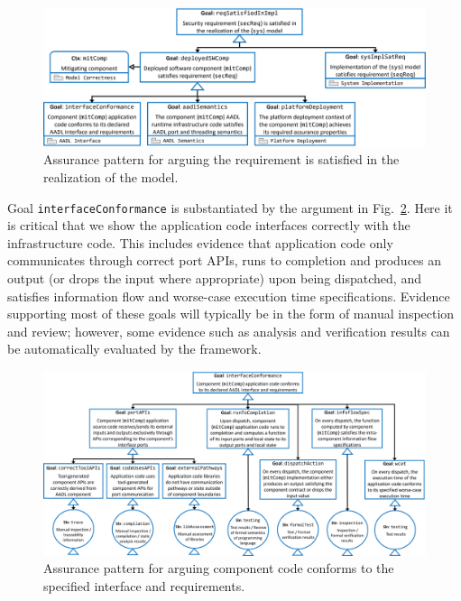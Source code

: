 \begin{figure}[h] 
	\centering 
	\includegraphics[width=\textwidth]{figs/req-satisfied-in-model-realization.png}
	\caption{Assurance pattern for arguing the requirement is satisfied in the realization of the model.}
	\label{fig:req-satisfied-in-model-realization} 
\end{figure}  

Goal \texttt{interfaceConformance} is substantiated by the argument in Fig.~\ref{fig:code-conforms-to-interface-and-requirements}.  Here it is critical that we show the application code interfaces correctly with the infrastructure code.  This includes evidence that application code only communicates through correct port APIs, runs to completion and produces an output (or drops the input where appropriate) upon being dispatched, and satisfies information flow and worse-case execution time specifications.  Evidence supporting most of these goals will typically be in the form of manual inspection and review; however, some evidence such as analysis and verification results can be automatically evaluated by the framework.

\begin{figure}[h]
	\centering 
	\includegraphics[width=\textwidth]{figs/code-conforms-to-interface-and-requirements.png}
	\caption{Assurance pattern for arguing component code conforms to the specified interface and requirements.}
	\label{fig:code-conforms-to-interface-and-requirements} 
\end{figure}

